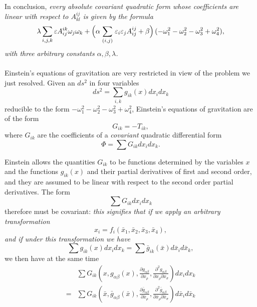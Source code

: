 \documentclass[leqno,12pt]{article}
\makeatletter
\let\old@epsilon\epsilon
\let\old@varepsilon\varepsilon
\let\epsilon\old@varepsilon
\let\varepsilon\old@epsilon
\newcommand{\pd}{\partial}
\theoremstyle{shape1}
\theoremstyle{shape0}
\theoremstyle{shape2}
\theoremstyle{definition}
\makeatother
\begin{document}
In conclusion, \emph{every absolute covariant quadratic form whose coefficients are linear with respect to $A^{ij}_{kl}$ is given by the formula}
\begin{equation}
  \label{eq:48}
  \lambda\sum_{i,j,k}\epsilon A^{ik}_{ij}\omega_{j}\omega_{k}+\left(\alpha\vphantom{\sum}\right.\sum_{(i,j)}\left.\epsilon_{i}\epsilon_{j}A^{ij}_{ij}+\beta\vphantom{\sum}\right)(-\omega_{1}^{2}-\omega_{2}^{2}-\omega_{3}^{2}+\omega_{4}^{2}),
\end{equation}
\emph{with three arbitrary constants $\alpha,\beta,\lambda$.}


\paragraph{}
\label{sec:33}
Einstein's equations of gravitation are very restricted in view of the problem we just resolved. Given an $ds^{2}$ in four variables
\[
ds^{2}=\sum_{i,k}g_{ik}(x)dx_{i}dx_{k}
\]
reducible to the form $-\omega_{1}^{2}-\omega_{2}^{2}-\omega_{3}^{2}+\omega_{4}^{2}$, Einstein's equations of gravitation are of the form
\[
G_{ik}=-T_{ik},
\]
where $G_{ik}$ are the coefficients of a \emph{covariant} quadratic differential form
\[
\Phi=\sum G_{ik}dx_{i}dx_{k}.
\]

Einstein allows the quantities $G_{ik}$ to be functions determined by the variables $x$ and the functions $g_{ik}(x)$ and their partial derivatives of first and second order, and they are assumed to be linear with respect to the second order partial derivatives. The form
\[
\sum G_{ik}dx_{i}dx_{k}
\]
therefore must be covariant: \emph{this signifies that if we apply an arbitrary transformation}
\[
x_{i}=f_{i}(\bar x_{1},\bar x_{2},\bar x_{3},\bar x_{4}),
\]
\emph{and if under this transformation we have}
\[
\sum{g_{ik}}(x)dx_{i}dx_{k}=\sum \bar g_{ik}(\bar x)d\bar x_{i}d\bar x_{k},
\]
we then have at the same time
\begin{align*}
  &{}\sum G_{ik}\left(x,g_{\alpha\beta}(x),\frac{\pd g_{\alpha\beta}}{\pd x_{\rho}},\frac{\pd^{2}g_{\alpha\beta}}{\pd x_{\rho}\pd x_{\sigma}}\right)dx_{i}dx_{k}\\
  =&{}\sum G_{ik}\left(\bar x,\bar g_{\alpha\beta}(\bar x),\frac{\pd \bar g_{\alpha\beta}}{\pd\bar x_{\rho}},\frac{\pd^{2}\bar g_{\alpha\beta}}{\pd\bar x_{\rho}\pd\bar x_{\sigma}}\right)d\bar x_{i}d\bar x_{k}
\end{align*}
\end{document}
